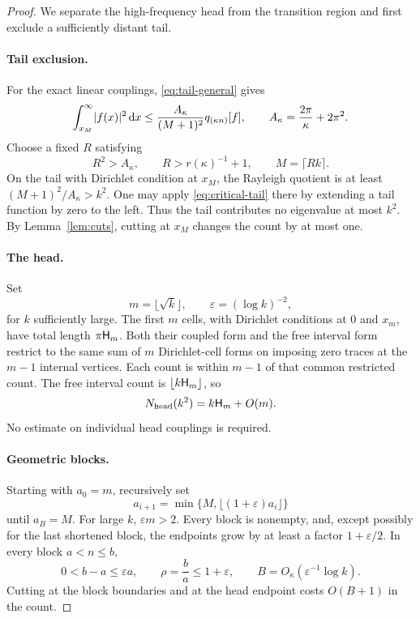 \begin{proof}
We separate the high-frequency head from the transition region
and first exclude a sufficiently distant tail.

\paragraph{Tail exclusion.}
For the exact linear couplings, \eqref{eq:tail-general} gives
\begin{equation}
 \int_{x_M}^\infty\lvert f(x)\rvert^2\,\mathrm d x
 \le\frac{A_\kappa}{(M+1)^2}q_{(\kappa n)}[f],
 \qquad A_\kappa=\frac{2\pi}{\kappa}+2\pi^2.
 \label{eq:critical-tail}
\end{equation}
Choose a fixed $R$ satisfying
\begin{equation}
 R^2>A_\kappa,\qquad R>r(\kappa)^{-1}+1,
 \qquad M=\lceil Rk\rceil.
 \label{eq:tail-cutoff}
\end{equation}
On the tail with Dirichlet condition at $x_M$, the Rayleigh
quotient is at least $(M+1)^2/A_\kappa>k^2$.
One may apply \eqref{eq:critical-tail} there by extending a tail
function by zero to the left. Thus the tail contributes no
eigenvalue at most $k^2$. By Lemma~\ref{lem:cuts}, cutting at
$x_M$ changes the count by at most one.

\paragraph{The head.}
Set
\begin{equation}
 m=\lfloor\sqrt{k}\rfloor,
 \qquad \varepsilon=(\log k)^{-2},
 \label{eq:mesoscopic-parameters}
\end{equation}
for $k$ sufficiently large. The first $m$ cells, with
Dirichlet conditions at $0$ and $x_m$, have total length
$\pi\mathsf H_m$. Both their coupled form and the free interval
form restrict to the same sum of $m$ Dirichlet-cell forms
on imposing zero traces at the $m-1$ internal vertices.
Each count is within $m-1$ of that common restricted count.
The free interval count is $\lfloor k\mathsf H_m\rfloor$, so
\begin{equation}
 N_{\mathrm{head}}(k^2)=k\mathsf H_m+O(m).
 \label{eq:head-count}
\end{equation}
No estimate on individual head couplings is required.

\paragraph{Geometric blocks.}
Starting with $a_0=m$, recursively set
\[
 a_{i+1}=\min\{M,\lfloor(1+\varepsilon)a_i\rfloor\}
\]
until $a_B=M$. For large $k$, $\varepsilon m>2$.
Every block is nonempty, and, except possibly for the last
shortened block, the endpoints grow by at least a factor
$1+\varepsilon/2$. In every block $a<n\le b$,
\begin{equation}
 0<b-a\le\varepsilon a,
 \qquad \rho=\frac ba\le1+\varepsilon,
 \qquad B=O_\kappa(\varepsilon^{-1}\log k).
 \label{eq:geometric-blocks}
\end{equation}
Cutting at the block boundaries and at the head endpoint
costs $O(B+1)$ in the count.


\end{proof}
